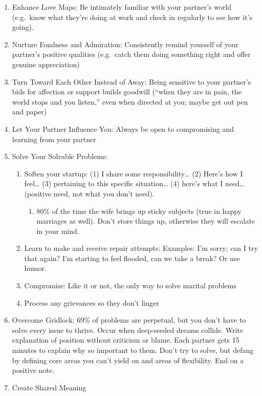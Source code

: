 \documentclass[
]{article}
\providecommand{\tightlist}{%
  \setlength{\itemsep}{0pt}\setlength{\parskip}{0pt}}
\begin{document}
\begin{enumerate}
\def\labelenumi{\arabic{enumi}.}
\item
  Enhance Love Maps: Be intimately familiar with your partner's world
  (e.g.~know what they're doing at work and check in regularly to see
  how it's going).
\item
  Nurture Fondness and Admiration: Consistently remind yourself of your
  partner's positive qualities (e.g.~catch them doing something right
  and offer genuine appreciation)
\item
  Turn Toward Each Other Instead of Away: Being sensitive to your
  partner's bids for affection or support builds goodwill (``when they
  are in pain, the world stops and you listen,'' even when directed at
  you; maybe get out pen and paper)
\item
  Let Your Partner Influence You: Always be open to compromising and
  learning from your partner
\item
  Solve Your Solvable Problems:

  \begin{enumerate}
  \def\labelenumii{\arabic{enumii}.}
  \item
    Soften your startup: (1) I share some responsibility\ldots{} (2)
    Here's how I feel\ldots{} (3) pertaining to this specific
    situation\ldots{} (4) here's what I need\ldots{} (positive need, not
    what you don't need).

    \begin{enumerate}
    \def\labelenumiii{\arabic{enumiii}.}
    \tightlist
    \item
      80\% of the time the wife brings up sticky subjects (true in happy
      marriages as well). Don't store things up, otherwise they will
      escalate in your mind.
    \end{enumerate}
  \item
    Learn to make and receive repair attempts: Examples: I'm sorry; can
    I try that again? I'm starting to feel flooded, can we take a break?
    Or use humor.
  \item
    Compromise: Like it or not, the only way to solve marital problems
  \item
    Process any grievances so they don't linger
  \end{enumerate}
\item
  Overcome Gridlock: 69\% of problems are perpetual, but you don't have
  to solve every issue to thrive. Occur when deep-seeded dreams collide.
  Write explanation of position without criticism or blame. Each partner
  gets 15 minutes to explain why so important to them. Don't try to
  solve, but defang by defining core areas you can't yield on and areas
  of flexibility. End on a positive note.
\item
  Create Shared Meaning


\end{enumerate}
\end{document}
